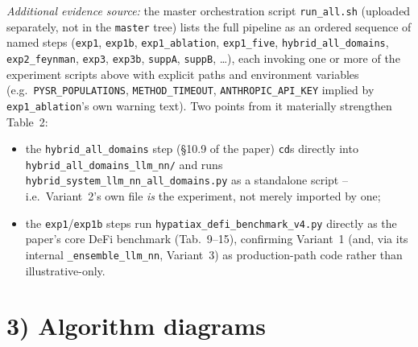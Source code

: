 \documentclass[11pt,a4paper]{article}
\newcommand{\code}[1]{\texttt{\small #1}}
\begin{document}
\noindent\textit{Additional evidence source:} the master orchestration script
\code{run\_all.sh} (uploaded separately, not in the \code{master} tree) lists
the full pipeline as an ordered sequence of named steps (\code{exp1},
\code{exp1b}, \code{exp1\_ablation}, \code{exp1\_five}, \code{hybrid\_all\_domains},
\code{exp2\_feynman}, \code{exp3}, \code{exp3b}, \code{suppA}, \code{suppB},
\ldots), each invoking one or more of the experiment scripts above with
explicit paths and environment variables (e.g.\ \code{PYSR\_POPULATIONS},
\code{METHOD\_TIMEOUT}, \code{ANTHROPIC\_API\_KEY} implied by \code{exp1\_ablation}'s
own warning text). Two points from it materially strengthen Table~2:
\begin{itemize}[leftmargin=1.3cm]
  \item the \code{hybrid\_all\_domains} step (\S10.9 of the paper) \code{cd}s
        directly into \code{hybrid\_all\_domains\_llm\_nn/} and runs
        \code{hybrid\_system\_llm\_nn\_all\_domains.py} as a standalone script --
        i.e.\ Variant~2's own file \emph{is} the experiment, not merely
        imported by one;
  \item the \code{exp1}/\code{exp1b} steps run \code{hypatiax\_defi\_benchmark\_v4.py}
        directly as the paper's core DeFi benchmark (Tab.\ 9--15), confirming
        Variant~1 (and, via its internal \code{\_ensemble\_llm\_nn}, Variant~3)
        as production-path code rather than illustrative-only.
\end{itemize}

\newpage
\section{3) Algorithm diagrams}
\end{document}
